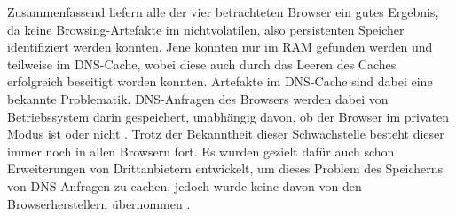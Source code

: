 \begin{comment}
Weiterführende Arbeiten:
> Cross-mode interference \cite{Hedberg.2013}:
	o	the Chrome://memory page displays all the opened tabs in the browser regardless if they are in the usual or private mode -> Nicht mehr aktuell -> Stattdessen: Chrome Task-manager (Ctrl + Esc), Funktioniert auch bei Firefox
> Unser Scope: Process Monitor nach Prozessnamen gefiltert
	- Weiterführend: Nach Pathnamen filtern: "Common Locations"

> Für wen wird Browser entwickelt
> Warum und für wen wird Private Browsing analysiert?
> Ist das Auffinden privater Browsing Artefakte Schuld von Browser Entwicklern? (Oder Schuld des Betriebssystem, wie in (TODO!) erwähnt)
\end{comment}


Zusammenfassend liefern alle der vier betrachteten Browser ein gutes Ergebnis, da keine Browsing-Artefakte im nichtvolatilen, also persistenten Speicher identifiziert werden konnten. Jene konnten nur im RAM gefunden werden und teilweise im DNS-Cache, wobei diese auch durch das Leeren des Caches erfolgreich beseitigt worden konnten. Artefakte im DNS-Cache sind dabei eine bekannte Problematik. DNS-Anfragen des Browsers werden dabei von Betriebssystem darin gespeichert, unabhängig davon, ob der Browser im privaten Modus ist oder nicht \cite{Satvat.2014}. Trotz der Bekanntheit dieser Schwachstelle besteht dieser immer noch in allen Browsern fort. Es wurden gezielt dafür auch schon Erweiterungen von Drittanbietern entwickelt, um dieses Problem des Speicherns von DNS-Anfragen zu cachen, jedoch wurde keine davon von den Browserherstellern übernommen \cite{Satvat.2014}. 

